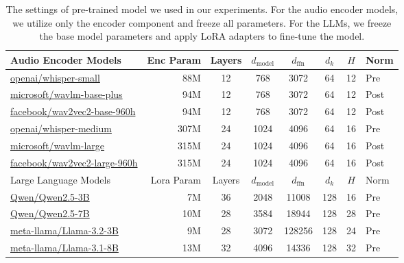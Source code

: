 \begin{table*}[htp]
\small
\centering
\begin{tabular}{l r c c c c c l}
\toprule
Audio Encoder Models & Enc Param & Layers & $d_{\text{model}}$ & $d_{\text{ffn}}$ & $d_k$ & $H$ & Norm \\ 
\midrule
\href{https://huggingface.co/openai/whisper-small}{openai/whisper-small} & 88M & 12 & 768 & 3072 & 64 & 12 & Pre \\
\href{https://huggingface.co/microsoft/wavlm-base-plus}{microsoft/wavlm-base-plus} & 94M & 12 & 768 & 3072 & 64 & 12 & Post \\
\href{https://huggingface.co/facebook/wav2vec2-base-960h}{facebook/wav2vec2-base-960h} & 94M & 12 & 768 & 3072 & 64 & 12 & Post \\
\href{https://huggingface.co/openai/whisper-medium}{openai/whisper-medium} & 307M & 24 & 1024 & 4096 & 64 & 16 & Pre \\
\href{https://huggingface.co/microsoft/wavlm-large}{microsoft/wavlm-large} & 315M & 24 & 1024 & 4096 & 64 & 16 & Post \\
\href{https://huggingface.co/facebook/wav2vec2-large-960h}{facebook/wav2vec2-large-960h} & 315M & 24 & 1024 & 4096 & 64 & 16 & Post \\
\midrule
Large Language Models & Lora Param & Layers & $d_{\text{model}}$ & $d_{\text{ffn}}$ & $d_k$ & $H$ & Norm \\
\midrule
\href{https://huggingface.co/Qwen/Qwen2.5-3B}{Qwen/Qwen2.5-3B} & 7M & 36 & 2048 & 11008 & 128 & 16 & Pre \\
\href{https://huggingface.co/Qwen/Qwen2.5-7B}{Qwen/Qwen2.5-7B} & 10M & 28 & 3584 & 18944 & 128 & 28 & Pre \\
\href{https://huggingface.co/meta-llama/Llama-3.2-3B}{meta-llama/Llama-3.2-3B} & 9M & 28 & 3072 & 128256 & 128 & 24 & Pre \\
\href{https://huggingface.co/meta-llama/Llama-3.1-8B}{meta-llama/Llama-3.1-8B} & 13M & 32 & 4096 & 14336 & 128 & 32 & Pre \\
\bottomrule
\end{tabular}
\caption{The settings of pre-trained model we used in our experiments. For the audio encoder models, we utilize only the encoder component and freeze all parameters. For the LLMs, we freeze the base model parameters and apply LoRA adapters to fine-tune the model.}


\label{tab:model-setting-detail}
\end{table*}

